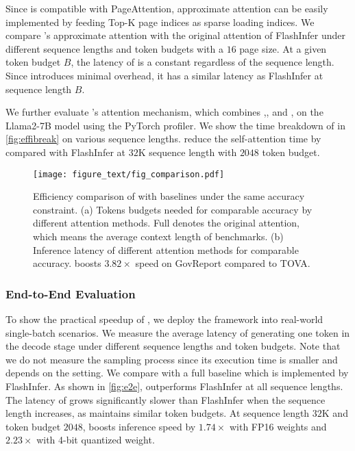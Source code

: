 \textbf{\approxattn{}}
Since \method{} is compatible with PageAttention, approximate attention can be easily implemented by feeding Top-K page indices as sparse loading indices. We compare \method{}'s approximate attention with the original attention of FlashInfer under different sequence lengths and token budgets with a $16$ page size. At a given token budget $B$, the latency of \approxattn{} is a constant regardless of the sequence length. Since \approxattn{} introduces minimal overhead, it has a similar latency as FlashInfer at sequence length $B$. 

We further evaluate \method{}'s attention mechanism, which combines \estimate{},\topk{}, and \approxattn{}, on the Llama2-7B model using the PyTorch profiler. We show the time breakdown of \method{} in \fig\ref{fig:effibreak} on various sequence lengths. \method{} reduce the self-attention time by \selfspeedup compared with FlashInfer at $32$K sequence length with $2048$ token budget.

\begin{figure*}[!h]
    \centering
     \texttt{[image: figure\_text/fig\_comparison.pdf]}
    \caption{Efficiency comparison of \method{} with baselines under the same accuracy constraint. (a) Tokens budgets needed for comparable accuracy by different attention methods. Full denotes the original attention, which means the average context length of benchmarks. (b) Inference latency of different attention methods for comparable accuracy. \method{} boosts $3.82\times$ speed on GovReport compared to TOVA.}
    \label{fig:comparision}

\end{figure*}

\subsubsection{End-to-End Evaluation}
\label{sec:eval:e2e}
To show the practical speedup of \method{}, we deploy the framework into real-world single-batch scenarios. We measure the average latency of generating one token in the decode stage under different sequence lengths and token budgets. Note that we do not measure the sampling process since its execution time is smaller and depends on the setting. We compare \method{} with a full \kvc{} baseline which is implemented by FlashInfer. As shown in \fig\ref{fig:e2e}, \method{} outperforms FlashInfer at all sequence lengths. The latency of \method{} grows significantly slower than FlashInfer when the sequence length increases, as \method{} maintains similar token budgets. At sequence length $32$K and token budget $2048$, \method{} boosts inference speed by $1.74\times$ with FP16 weights and $2.23\times$ with 4-bit quantized weight. 

